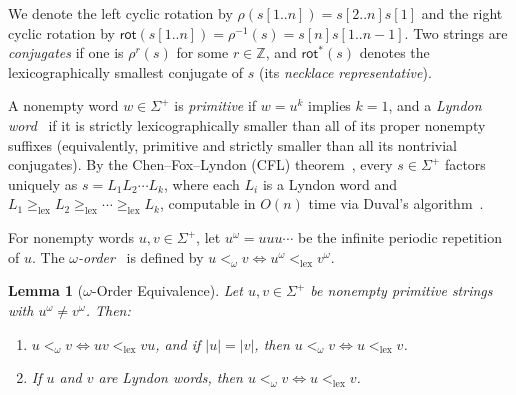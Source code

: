 \documentclass[11pt,a4paper]{article}
\newtheorem{lemma}{Lemma}
\theoremstyle{definition}
\newcommand{\rot}{\mathsf{rot}}
\newcommand{\lex}{\mathrm{lex}}
\begin{document}
We denote the left cyclic rotation by $\rho(s[1..n]) = s[2..n]s[1]$ and the right cyclic rotation by $\rot(s[1..n]) = \rho^{-1}(s) = s[n]s[1..n-1]$. Two strings are \emph{conjugates} if one is $\rho^r(s)$ for some $r \in \mathbb{Z}$, and $\rot^*(s)$ denotes the lexicographically smallest conjugate of $s$ (its \emph{necklace representative}).

A nonempty word $w \in \Sigma^+$ is \emph{primitive} if $w = u^k$ implies $k = 1$, and a \emph{Lyndon word}~\cite{Lyndon1954} if it is strictly lexicographically smaller than all of its proper nonempty suffixes (equivalently, primitive and strictly smaller than all its nontrivial conjugates). By the Chen--Fox--Lyndon (CFL) theorem~\cite{ChenFoxLyndon1958}, every $s \in \Sigma^+$ factors uniquely as $s = L_1 L_2 \cdots L_k$, where each $L_i$ is a Lyndon word and $L_1 \ge_{\lex} L_2 \ge_{\lex} \cdots \ge_{\lex} L_k$, computable in $O(n)$ time via Duval's algorithm~\cite{Duval1983}.

For nonempty words $u, v \in \Sigma^+$, let $u^\omega = uuu\cdots$ be the infinite periodic repetition of $u$. The \emph{$\omega$-order}~\cite{Mantaci2007} is defined by $u <_\omega v \iff u^\omega <_{\lex} v^\omega$.

\begin{lemma}[$\omega$-Order Equivalence]
\label{lem:omega-order}
Let $u, v \in \Sigma^+$ be nonempty primitive strings with $u^\omega \neq v^\omega$. Then:
\begin{enumerate}[label=(\roman*),leftmargin=*]
    \item $u <_\omega v \iff uv <_{\lex} vu$, and if $|u| = |v|$, then $u <_\omega v \iff u <_{\lex} v$.
    \item If $u$ and $v$ are Lyndon words, then $u <_\omega v \iff u <_{\lex} v$.
\end{enumerate}
\end{lemma}
\end{document}

